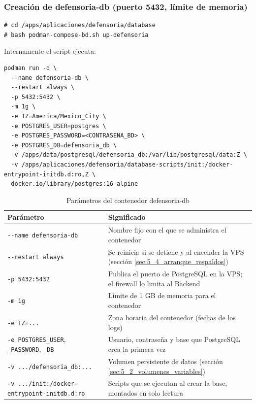 \subsubsection{Creación de defensoria-db (puerto 5432, límite de memoria)}
\begin{lstlisting}
# cd /apps/aplicaciones/defensoria/database
# bash podman-compose-bd.sh up-defensoria
\end{lstlisting}
Internamente el script ejecuta:
\begin{lstlisting}
podman run -d \
  --name defensoria-db \
  --restart always \
  -p 5432:5432 \
  -m 1g \
  -e TZ=America/Mexico_City \
  -e POSTGRES_USER=postgres \
  -e POSTGRES_PASSWORD=<CONTRASENA_BD> \
  -e POSTGRES_DB=defensoria_db \
  -v /apps/data/postgresql/defensoria_db:/var/lib/postgresql/data:Z \
  -v /apps/aplicaciones/defensoria/database-scripts/init:/docker-entrypoint-initdb.d:ro,Z \
  docker.io/library/postgres:16-alpine
\end{lstlisting}
\begin{table}[H]
\centering
\caption{Parámetros del contenedor defensoria-db}
\footnotesize
\begin{tabular}{p{4.6cm}p{9.8cm}}
\toprule
\textbf{Parámetro} & \textbf{Significado} \\
\midrule
\texttt{-{}-name defensoria-db} & Nombre fijo con el que se administra el contenedor \\
\texttt{-{}-restart always} & Se reinicia si se detiene y al encender la VPS (sección \ref{sec:5_4_arranque_respaldos}) \\
\texttt{-p 5432:5432} & Publica el puerto de PostgreSQL en la VPS; el firewall lo limita al Backend \\
\texttt{-m 1g} & Límite de 1 GB de memoria para el contenedor \\
\texttt{-e TZ=...} & Zona horaria del contenedor (fechas de los logs) \\
\texttt{-e POSTGRES\_USER}, \texttt{\_PASSWORD}, \texttt{\_DB} & Usuario, contraseña y base que PostgreSQL crea la primera vez \\
\nolinkurl{-v .../defensoria_db:...} & Volumen persistente de datos (sección \ref{sec:5_2_volumenes_variables}) \\
\nolinkurl{-v .../init:/docker-entrypoint-initdb.d:ro} & Scripts que se ejecutan al crear la base, montados en solo lectura \\
\bottomrule
\end{tabular}
\end{table}

